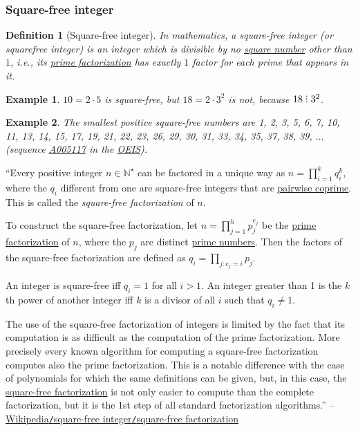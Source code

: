 \documentclass{article}
\newtheorem{definition}{Definition}
\newtheorem{example}{Example}
\DeclareRobustCommand{\divby}{%
	\mathrel{\vbox{\baselineskip.65ex\lineskiplimit0pt\hbox{.}\hbox{.}\hbox{.}}}%
}
\begin{document}
\subsubsection{Square-free integer}

\begin{definition}[Square-free integer]
	In mathematics, a \emph{square-free integer} (or \emph{squarefree integer}) is an integer which is divisible by no \href{https://en.wikipedia.org/wiki/Square_number}{square number} other than $1$, i.e., its \href{https://en.wikipedia.org/wiki/Prime_factorization}{prime factorization} has exactly $1$ factor for each prime that appears in it.
\end{definition}

\begin{example}
	$10 = 2\cdot5$ is square-free, but $18 = 2\cdot3^2$ is not, because $18\divby3^2$.
\end{example}

\begin{example}
	The smallest positive square-free numbers are \emph{1, 2, 3, 5, 6, 7, 10, 11, 13, 14, 15, 17, 19, 21, 22, 23, 26, 29, 30, 31, 33, 34, 35, 37, 38, 39}, $\ldots$ (sequence \href{https://oeis.org/A005117}{A005117} in the \href{https://en.wikipedia.org/wiki/On-Line_Encyclopedia_of_Integer_Sequences}{OEIS}).
\end{example}
``Every positive integer $n\in\mathbb{N}^\star$ can be factored in a unique way as $n = \prod_{i=1}^k q_i^k$, where the $q_i$ different from one are square-free integers that are \href{https://en.wikipedia.org/wiki/Pairwise_coprime}{pairwise coprime}. This is called the \textit{square-free factorization} of $n$.

To construct the square-free factorization, let $n = \prod_{j=1}^h p_j^{e_j}$ be the \href{https://en.wikipedia.org/wiki/Prime_factorization}{prime factorization} of $n$, where the $p_j$ are distinct \href{https://en.wikipedia.org/wiki/Prime_number}{prime numbers}. Then the factors of the square-free factorization are defined as $q_i = \prod_{j:e_j = i} p_j$.

An integer is square-free iff $q_i = 1$ for all $i > 1$. An integer greater than 1 is the $k$th power of another integer iff $k$ is a divisor of all $i$ such that $q_i\ne1$.

The use of the square-free factorization of integers is limited by the fact that its computation is as difficult as the computation of the prime factorization. More precisely every known algorithm for computing a square-free factorization computes also the prime factorization. This is a notable difference with the case of polynomials for which the same definitions can be given, but, in this case, the \href{https://en.wikipedia.org/wiki/Square-free_factorization}{square-free factorization} is not only easier to compute than the complete factorization, but it is the 1st step of all standard factorization algorithms.'' -- \href{https://en.wikipedia.org/wiki/Square-free_integer#Square-free_factorization}{Wikipedia{\tt/}square-free integer{\tt/}square-free factorization}
\end{document}
